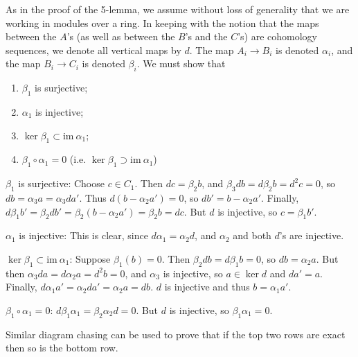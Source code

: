 \documentclass[12pt]{article}
\begin{document}
As in the proof of the 5-lemma, we assume without loss of generality that we are working in modules over a ring. In keeping with the notion that the maps between the $A$'s (as well as between the $B$'s and the $C$'s) are cohomology sequences, we denote all vertical maps by $d$. The map $A_i\to B_i$ is denoted $\alpha_i$, and the map $B_i\to C_i$ is denoted $\beta_i$. We must show that
\begin{enumerate}
\item $\beta_1$ is surjective;
\item $\alpha_1$ is injective;
\item $\ker \beta_1 \subset \mathrm{im}\  \alpha_1$;
\item $\beta_1\circ\alpha_1=0$ (i.e. $\ker \beta_1 \supset \mathrm{im}\  \alpha_1$)
\end{enumerate}

$\beta_1$ is surjective: Choose $c\in C_1$. Then $dc = \beta_2 b$, and $\beta_3db=d\beta_2b=d^2c=0$, so $db=\alpha_3a=\alpha_3 da'$. Thus $d(b-\alpha_2 a')=0$, so $db'=b-\alpha_2 a'$. Finally, $d\beta_1 b'=\beta_2 db'=\beta_2(b-\alpha_2a')=\beta_2 b=dc$. But $d$ is injective, so $c=\beta_1 b'$.

$\alpha_1$ is injective: This is clear, since $d\alpha_1=\alpha_2 d$, and $\alpha_2$ and both $d$'s are injective.

$\ker \beta_1\subset \mathrm{im}\ \alpha_1$: Suppose $\beta_1(b)=0$. Then $\beta_2 db=d\beta_1 b=0$, so $db=\alpha_2 a$. But then $\alpha_3 da=d\alpha_2 a=d^2b=0$, and $\alpha_3$ is injective, so $a\in\ker d$ and $da'=a$. Finally, $d\alpha_1 a'=\alpha_2 da'=\alpha_2 a=db$. $d$ is injective and thus $b=\alpha_1 a'$.

$\beta_1\circ\alpha_1=0$: $d\beta_1\alpha_1=\beta_2\alpha_2d=0$. But $d$ is injective, so $\beta_1\alpha_1=0$.

Similar diagram chasing can be used to prove that if the top two rows are exact then so is the bottom row.
\end{document}
